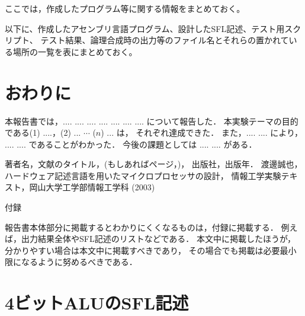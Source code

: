 \documentclass{jarticle}[11pt]
\begin{document}
ここでは，作成したプログラム等に関する情報をまとめておく。


以下に、作成したアセンブリ言語プログラム、設計したSFL記述、テスト用スクリプト、
テスト結果、論理合成時の出力等のファイル名とそれらの置かれている場所の一覧を表にまとめておく。




\section{おわりに}
\label{sec:おわりに}
% 

\noindent

本報告書では，.... .... .... .... .... .... .... について報告した．
本実験テーマの目的である(1) ....，(2) ... $\cdots$ ($n$) ... は，
それぞれ達成できた．
また，.... .... により， .... .... であることがわかった．
今後の課題としては .... .... がある．

\begin{thebibliography}{99}
 著者名，文献のタイトル，(もしあればページ，)，
出版社，出版年．
渡邊誠也，ハードウェア記述言語を用いたマイクロプロセッサの設計，
情報工学実験テキスト，岡山大学工学部情報工学科 (2003)
\end{thebibliography}


\newpage
\appendix

\noindent
{\Large \gt 付録}

報告書本体部分に掲載するとわかりにくくなるものは，付録に掲載する．
例えば，出力結果全体やSFL記述のリストなどである．
本文中に掲載したほうが，分かりやすい場合は本文中に掲載すべきであり，
その場合でも掲載は必要最小限になるように努めるべきである．

\section{4ビットALUのSFL記述}
\label{appsec:4ビットALUのSFL記述}
\end{document}

